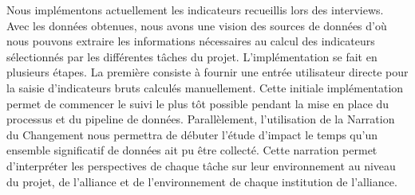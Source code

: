 Nous implémentons actuellement les indicateurs recueillis lors des interviews. Avec les données obtenues, nous avons  une vision des sources de données d'où nous pouvons extraire les informations nécessaires au calcul des indicateurs sélectionnés par les différentes tâches du projet. 
L'implémentation se fait en plusieurs étapes. La première consiste à fournir une entrée utilisateur directe pour la saisie d'indicateurs bruts calculés manuellement. Cette initiale implémentation permet de commencer le suivi le plus tôt possible pendant la mise en place du processus et du pipeline de données. 
Parallèlement, l'utilisation de la Narration du Changement nous permettra de débuter l'étude d'impact le temps qu'un ensemble significatif de données ait pu être collecté. Cette narration permet d'interpréter les perspectives de chaque tâche sur leur environnement au niveau du projet, de l'alliance et de l'environnement de chaque institution de l'alliance.